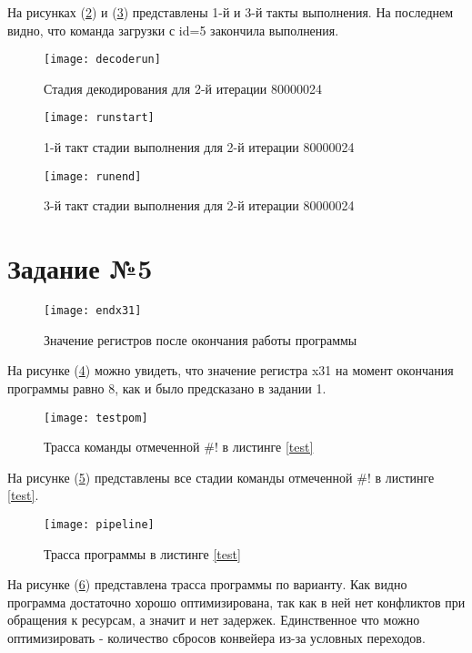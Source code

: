 На рисунках (\ref{fig:runstart}) и (\ref{fig:runend}) представлены 1-й и 3-й такты выполнения. На последнем видно, что команда загрузки 
с id=5 закончила выполнения.

\begin{figure}[h]
	\centering
	\texttt{[image: decoderun]}
	\caption{Стадия декодирования для 2-й итерации 80000024}
	\label{fig:decoderun}
\end{figure}

\begin{figure}[h]
	\centering
	\texttt{[image: runstart]}
	\caption{1-й такт стадии выполнения для 2-й итерации 80000024}
	\label{fig:runstart}
\end{figure}

\begin{figure}[h]
	\centering
	\texttt{[image: runend]}
	\caption{3-й такт стадии выполнения для 2-й итерации 80000024}
	\label{fig:runend}
\end{figure}

\clearpage

\section{Задание №5}

\begin{figure}[h]
	\centering
	\texttt{[image: endx31]}
	\caption{Значение регистров после окончания работы программы}
	\label{fig:endx31}
\end{figure}

На рисунке (\ref{fig:endx31}) можно увидеть, что значение регистра x31 на момент окончания программы равно 8, как и было предсказано в задании 1.

\begin{figure}[h]
	\centering
	\texttt{[image: testpom]}
	\caption{Трасса команды отмеченной \#! в листинге \ref{test}}
	\label{fig:testpom}
\end{figure}

На рисунке (\ref{fig:testpom}) представлены все стадии команды отмеченной \#! в листинге \ref{test}.

\begin{figure}[h]
	\centering
	\texttt{[image: pipeline]}
	\caption{Трасса программы в листинге \ref{test}}
	\label{fig:pipeline}
\end{figure}

На рисунке (\ref{fig:pipeline}) представлена трасса программы по варианту. Как видно программа достаточно хорошо оптимизирована, так как в ней нет конфликтов при обращения к ресурсам, а значит и нет задержек. Единственное что можно оптимизировать - количество сбросов конвейера из-за условных переходов.

